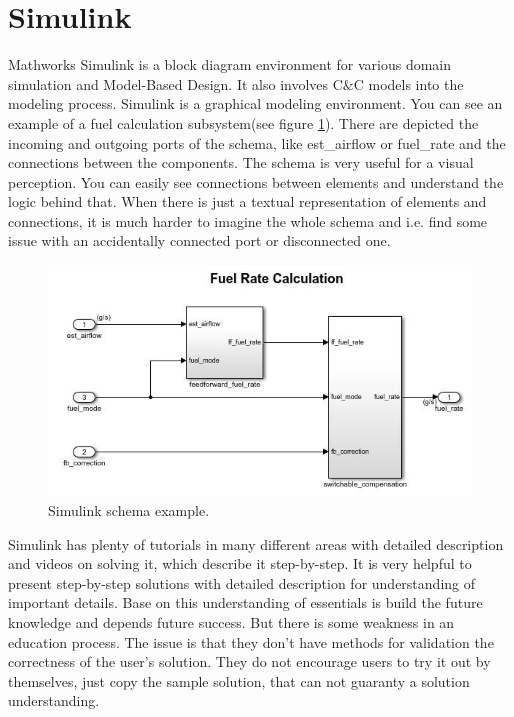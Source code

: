 \section{Simulink} \label{sec:simulink}
Mathworks Simulink \cite{Mathworks} is a block diagram environment for various domain simulation and Model-Based Design. It also involves C\&C models into the modeling process. Simulink is a graphical modeling environment. You can see an example of a fuel calculation subsystem(see figure \ref{fig:simulink}). There are depicted the incoming and outgoing ports of the schema, like est\_airflow or fuel\_rate and the connections between the components. The schema is very useful for a visual perception. You can easily see connections between elements and understand the logic behind that. When there is just a textual representation of elements and connections, it is much harder to imagine the whole schema and i.e. find some issue with an accidentally connected port or disconnected one.
\begin{figure}[h!]
    \centering
    \includegraphics[width=0.7\linewidth]{src/pic/simulink}
    \caption{Simulink schema example.}
    \label{fig:simulink}
\end{figure}
Simulink has plenty of tutorials in many different areas with detailed description and videos on solving it, which describe it step-by-step. It is very helpful to present step-by-step solutions with detailed description for understanding of important details. Base on this understanding of essentials is build the future knowledge and depends future success. But there is some weakness in an education process. The issue is that they don't have methods for validation the correctness of the user's solution. They do not encourage users to try it out by themselves, just copy the sample solution, that can not guaranty a solution understanding.

